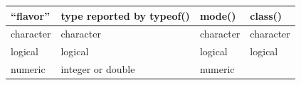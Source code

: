 \documentclass[
]{book}
\begin{document}
\begin{longtable}[]{@{}llll@{}}
\toprule
\begin{minipage}[b]{0.15\columnwidth}\raggedright
``flavor''\strut
\end{minipage} & \begin{minipage}[b]{0.20\columnwidth}\raggedright
type reported
by typeof()\strut
\end{minipage} & \begin{minipage}[b]{0.15\columnwidth}\raggedright
mode()\strut
\end{minipage} & \begin{minipage}[b]{0.15\columnwidth}\raggedright
class()\strut
\end{minipage}\tabularnewline
\midrule
\endhead
\begin{minipage}[t]{0.15\columnwidth}\raggedright
character\strut
\end{minipage} & \begin{minipage}[t]{0.20\columnwidth}\raggedright
character\strut
\end{minipage} & \begin{minipage}[t]{0.15\columnwidth}\raggedright
character\strut
\end{minipage} & \begin{minipage}[t]{0.15\columnwidth}\raggedright
character\strut
\end{minipage}\tabularnewline
\begin{minipage}[t]{0.15\columnwidth}\raggedright
logical\strut
\end{minipage} & \begin{minipage}[t]{0.20\columnwidth}\raggedright
logical\strut
\end{minipage} & \begin{minipage}[t]{0.15\columnwidth}\raggedright
logical\strut
\end{minipage} & \begin{minipage}[t]{0.15\columnwidth}\raggedright
logical\strut
\end{minipage}\tabularnewline
\begin{minipage}[t]{0.15\columnwidth}\raggedright
numeric\strut
\end{minipage} & \begin{minipage}[t]{0.20\columnwidth}\raggedright
integer
or double\strut
\end{minipage} & \begin{minipage}[t]{0.15\columnwidth}\raggedright
numeric\strut
\end{minipage} & \begin{minipage}[t]{0.15\columnwidth}\raggedright

\end{minipage}
\end{longtable}
\end{document}
